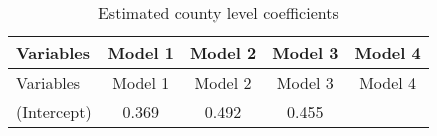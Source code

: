 \documentclass[12pt,twoside]{reedthesis}
\begin{document}
  \begin{longtable}[]{@{}lcccc@{}}
  \caption{Estimated county level coefficients
  \label{tab:county_coef}}\tabularnewline
  \toprule
  \begin{minipage}[b]{0.26\columnwidth}\raggedright\strut
  Variables\strut
  \end{minipage} & \begin{minipage}[b]{0.12\columnwidth}\centering\strut
  Model 1\strut
  \end{minipage} & \begin{minipage}[b]{0.14\columnwidth}\centering\strut
  Model 2\strut
  \end{minipage} & \begin{minipage}[b]{0.14\columnwidth}\centering\strut
  Model 3\strut
  \end{minipage} & \begin{minipage}[b]{0.14\columnwidth}\centering\strut
  Model 4\strut
  \end{minipage}\tabularnewline
  \midrule
  \endfirsthead
  \toprule
  \begin{minipage}[b]{0.26\columnwidth}\raggedright\strut
  Variables\strut
  \end{minipage} & \begin{minipage}[b]{0.12\columnwidth}\centering\strut
  Model 1\strut
  \end{minipage} & \begin{minipage}[b]{0.14\columnwidth}\centering\strut
  Model 2\strut
  \end{minipage} & \begin{minipage}[b]{0.14\columnwidth}\centering\strut
  Model 3\strut
  \end{minipage} & \begin{minipage}[b]{0.14\columnwidth}\centering\strut
  Model 4\strut
  \end{minipage}\tabularnewline
  \midrule
  \endhead
  \begin{minipage}[t]{0.26\columnwidth}\raggedright\strut
  (Intercept)\strut
  \end{minipage} & \begin{minipage}[t]{0.12\columnwidth}\centering\strut
  0.369\strut
  \end{minipage} & \begin{minipage}[t]{0.14\columnwidth}\centering\strut
  0.492\strut
  \end{minipage} & \begin{minipage}[t]{0.14\columnwidth}\centering\strut
  0.455\strut
  \end{minipage} & \begin{minipage}[t]{0.14\columnwidth}\centering\strut

\end{minipage}
\end{longtable}
\end{document}
